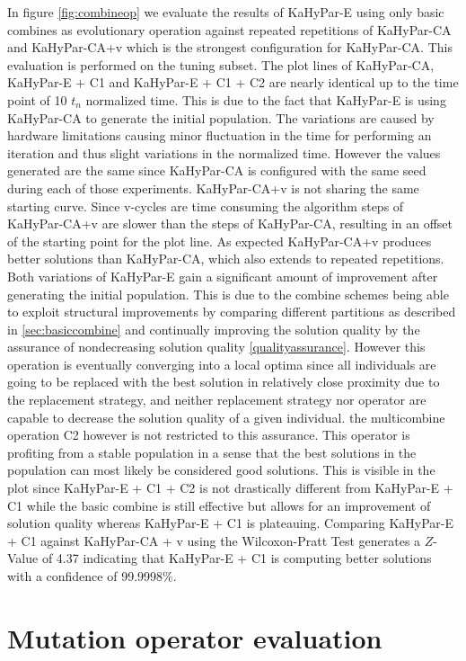 \documentclass[a4paper,12pt,titlepage, BCOR7mm,headsepline]{scrbook}
\numberwithin{equation}{section}
\begin{document}
In figure \ref{fig:combineop} we evaluate the results of KaHyPar-E using only basic combines as evolutionary operation against repeated repetitions of KaHyPar-CA and KaHyPar-CA+v which is the strongest configuration for KaHyPar-CA. This evaluation is performed on the tuning subset. The plot lines of KaHyPar-CA, KaHyPar-E + C1 and KaHyPar-E + C1 + C2 are nearly identical up to the time point of 10 $t_n$ normalized time. This is due to the fact that KaHyPar-E is using KaHyPar-CA to generate the initial population. The variations are caused by hardware limitations causing minor fluctuation in the time for performing an iteration and thus slight variations in the normalized time. However the values generated are the same since KaHyPar-CA is configured with the same seed during each of those experiments. KaHyPar-CA+v is not sharing the same starting curve. Since v-cycles are time consuming the algorithm steps of KaHyPar-CA+v are slower than the steps of KaHyPar-CA, resulting in an offset of the starting point for the plot line. As expected KaHyPar-CA+v produces better solutions than KaHyPar-CA, which also extends to repeated repetitions. Both variations of KaHyPar-E gain a significant amount of improvement after generating the initial population. This is due to the combine schemes being able to exploit structural improvements by comparing different partitions as described in \ref{sec:basiccombine} and continually improving the solution quality by the assurance of nondecreasing solution quality \ref{qualityassurance}. However this operation is eventually converging into a local optima since all individuals are going to be replaced with the best solution in relatively close proximity due to the replacement strategy, and neither replacement strategy nor operator are capable to decrease the solution quality of a given individual. the multicombine operation C2 however is not restricted to this assurance. This operator is profiting from a stable population in a sense that the best solutions in the population can most likely be considered good solutions. This is visible in the plot since KaHyPar-E + C1 + C2 is not drastically different from KaHyPar-E + C1 while the basic combine is still effective but allows for an improvement of solution quality whereas KaHyPar-E + C1 is plateauing. Comparing KaHyPar-E + C1 against KaHyPar-CA + v using the Wilcoxon-Pratt Test generates a $Z$-Value of 4.37 indicating that KaHyPar-E + C1 is computing better solutions with a confidence of 99.9998\%.
\section{Mutation operator evaluation}
\end{document}
